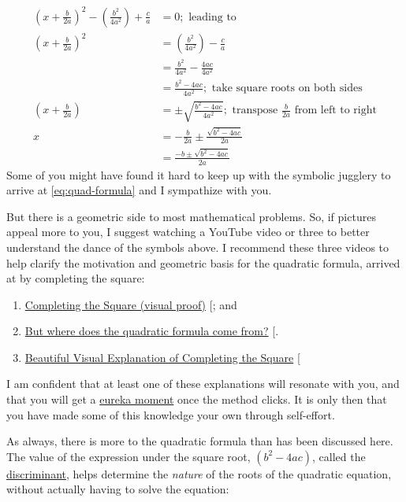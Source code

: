 \documentclass[
  a4paper,
]{article}
\begin{document}
\begin{enumerate}
\begin{equation}
{\begin{aligned}
  \left(x + \frac{b}{2a}\right)^2 - \left(\frac{b^2}{4a^2}\right) + \frac{c}{a} &= 0; \text{ leading to}\\
  \left(x + \frac{b}{2a}\right)^2 &= \left(\frac{b^2}{4a^2}\right) - \frac{c}{a}\\
  &= \frac{b^2}{4a^2} - \frac{4ac}{4a^2}\\
  &= \frac{b^2 - 4ac}{4a^2}; \text{ take square roots on both sides}\\
  \left(x + \frac{b}{2a}\right) &= \pm\sqrt{\frac{b^2 - 4ac}{4a^2}}; \text{ transpose $\frac{b}{2a}$ from left to right}\\
  x &= -\frac{b}{2a} \pm \frac{\sqrt{b^2 - 4ac}}{2a}\\
  &=\frac{-{b} \pm \sqrt{b^2 - 4ac}}{2a}
  \end{aligned}
  }\end{equation} Some of you might have found it hard to keep up with
  the symbolic jugglery to arrive at \cref{eq:quad-formula} and I
  sympathize with you.
\end{enumerate}

But there is a geometric side to most mathematical problems. So, if
pictures appeal more to you, I suggest watching a YouTube video or three
to better understand the dance of the symbols above. I recommend these
three videos to help clarify the motivation and geometric basis for the
quadratic formula, arrived at by completing the square:

\begin{enumerate}
\def\labelenumi{\alph{enumi}.}
\item
  \href{https://www.youtube.com/watch?v=T0HyWIFbsHQ}{Completing the
  Square (visual proof)} {[}\citeproc{ref-mvp-2022}{2}{]}; and
\item
  \href{https://www.youtube.com/watch?v=7Q4h1YTYgnE}{But where does the
  quadratic formula come from?}
  {[}\citeproc{ref-foggy-maths-2023}{3}{]}.
\item
  \href{https://www.youtube.com/watch?v=McDdEw_Fb5E}{Beautiful Visual
  Explanation of Completing the Square} {[}\citeproc{ref-woo-2016}{4}{]}
\end{enumerate}

I am confident that at least one of these explanations will resonate
with you, and that you will get a
\href{https://nesslabs.com/eureka-moments}{eureka moment} once the
method clicks. It is only then that you have made some of this knowledge
your own through self-effort.

As always, there is more to the quadratic formula than has been
discussed here. The value of the expression under the square root,
\((b^2 - 4ac)\), called the
\href{https://www.britannica.com/science/discriminant}{discriminant},
helps determine the \emph{nature} of the roots of the quadratic
equation, without actually having to solve the equation:
\end{document}
